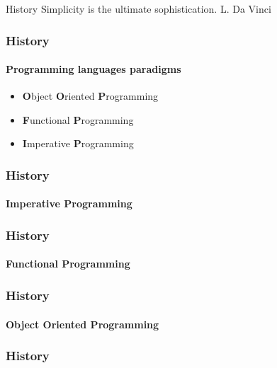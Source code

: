 \begin{sepframe}{History}
    {\scriptsize{Simplicity is the ultimate sophistication. L. Da Vinci}}
\end{sepframe}

\begin{frame}[fragile,c]
\end{frame}

\begin{frame}
    \frametitle{History}
    \framesubtitle{Programming languages paradigms}

    \begin{itemize}[<+->]
        \item \textbf{O}bject \textbf{O}riented \textbf{P}rogramming
        \item \textbf{F}unctional \textbf{P}rogramming
        \item \textbf{I}mperative \textbf{P}rogramming
    \end{itemize}
\end{frame}

\begin{frame}[fragile,c]
    \frametitle{History}
    \framesubtitle{\textbf{I}mperative \textbf{P}rogramming}

\end{frame}

\begin{frame}[fragile,c]
    
\end{frame}

\begin{frame}[fragile,c]
    \frametitle{History}
    \framesubtitle{\textbf{F}unctional \textbf{P}rogramming}

\end{frame}

\begin{frame}[fragile,c]
    
\end{frame}

\begin{frame}[fragile,c]
    \frametitle{History}
    \framesubtitle{\textbf{O}bject \textbf{O}riented \textbf{P}rogramming}

\end{frame}

\begin{frame}[fragile,c]
    \frametitle{History}
    \begin{figure}
    \end{figure}
\end{frame}

